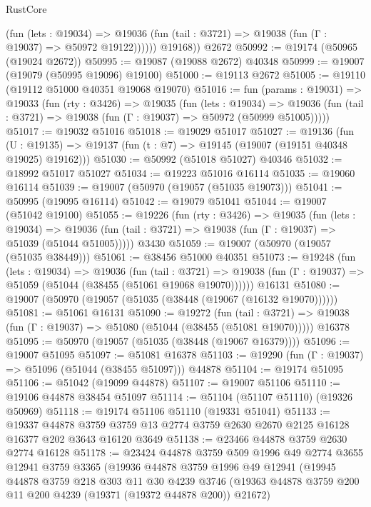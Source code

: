 \begin{lexlean}{RustCore}
\begin{coremodule}
              (fun (lets : @19034) =>
              @19036 (fun (tail : @3721) => @19038 (fun (Γ : @19037) => @50972 @19122))))))
        @19168))
    @2672
@50992 := @19174 (@50965 (@19024 @2672))
@50995 := @19087 (@19088 @2672) @40348
@50999 := @19007 (@19079 (@50995 @19096) @19100)
@51000 := @19113 @2672
@51005 := @19110 (@19112 @51000 @40351 @19068 @19070)
@51016 := fun (params : @19031) =>
  @19033
    (fun (rty : @3426) =>
    @19035
      (fun (lets : @19034) =>
      @19036 (fun (tail : @3721) => @19038 (fun (Γ : @19037) => @50972 (@50999 @51005)))))
@51017 := @19032 @51016
@51018 := @19029 @51017
@51027 := @19136
    (fun (U : @19135) => @19137 (fun (t : @7) => @19145 (@19007 (@19151 @40348 @19025) @19162)))
@51030 := @50992 (@51018 @51027) @40346
@51032 := @18992 @51017 @51027
@51034 := @19223 @51016 @16114
@51035 := @19060 @16114
@51039 := @19007 (@50970 (@19057 (@51035 @19073)))
@51041 := @50995 (@19095 @16114)
@51042 := @19079 @51041
@51044 := @19007 (@51042 @19100)
@51055 := @19226
    (fun (rty : @3426) =>
    @19035
      (fun (lets : @19034) =>
      @19036 (fun (tail : @3721) => @19038 (fun (Γ : @19037) => @51039 (@51044 @51005)))))
    @3430
@51059 := @19007 (@50970 (@19057 (@51035 @38449)))
@51061 := @38456 @51000 @40351
@51073 := @19248
    (fun (lets : @19034) =>
    @19036
      (fun (tail : @3721) =>
      @19038 (fun (Γ : @19037) => @51059 (@51044 (@38455 (@51061 @19068 @19070))))))
    @16131
@51080 := @19007 (@50970 (@19057 (@51035 (@38448 (@19067 (@16132 @19070))))))
@51081 := @51061 @16131
@51090 := @19272
    (fun (tail : @3721) => @19038 (fun (Γ : @19037) => @51080 (@51044 (@38455 (@51081 @19070)))))
    @16378
@51095 := @50970 (@19057 (@51035 (@38448 (@19067 @16379))))
@51096 := @19007 @51095
@51097 := @51081 @16378
@51103 := @19290 (fun (Γ : @19037) => @51096 (@51044 (@38455 @51097))) @44878
@51104 := @19174 @51095
@51106 := @51042 (@19099 @44878)
@51107 := @19007 @51106
@51110 := @19106 @44878 @38454 @51097
@51114 := @51104 (@51107 @51110) (@19326 @50969)
@51118 := @19174 @51106 @51110 (@19331 @51041)
@51133 := @19337
    @44878
    @3759
    @3759
    @13
    @2774
    @3759
    @2630
    @2670
    @2125
    @16128
    @16377
    @202
    @3643
    @16120
    @3649
@51138 := @23466 @44878 @3759 @2630 @2774 @16128
@51178 := @23424
    @44878
    @3759
    @509
    @1996
    @49
    @2774
    @3655
    @12941
    @3759
    @3365
    (@19936
      @44878
      @3759
      @1996
      @49
      @12941
      (@19945
        @44878
        @3759
        @218
        @303
        @11
        @30
        @4239
        @3746
        (@19363 @44878 @3759 @200 @11 @200 @4239 (@19371 (@19372 @44878 @200)) @21672)

\end{coremodule}
\end{lexlean}
